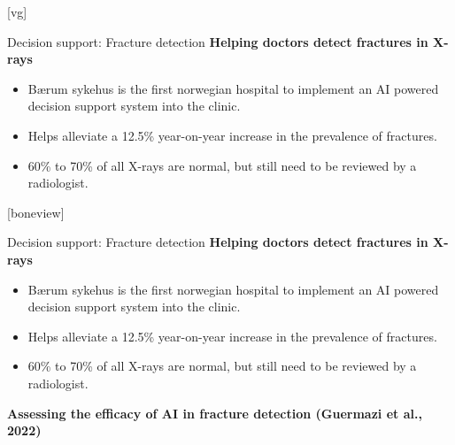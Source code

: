 \documentclass[8pt]{beamer}
\begin{document}
	[vg]

	\begin{frame}[t]{Decision support: Fracture detection}
		\textbf{Helping doctors detect fractures in X-rays}\\
		\begin{itemize}
			\item Bærum sykehus is the first norwegian hospital to implement an AI powered decision support system into the clinic.
			\item Helps alleviate a 12.5\% year-on-year increase in the prevalence of fractures.
			\item 60\% to 70\% of all X-rays are normal, but still need to be reviewed by a radiologist.
		\end{itemize}
		\vspace{0.5cm}
		\centering
	\end{frame}

	[boneview]

	\begin{frame}[t]{Decision support: Fracture detection}
		\textbf{Helping doctors detect fractures in X-rays}\\
		\begin{itemize}
			\item Bærum sykehus is the first norwegian hospital to implement an AI powered decision support system into the clinic.
			\item Helps alleviate a 12.5\% year-on-year increase in the prevalence of fractures.
			\item 60\% to 70\% of all X-rays are normal, but still need to be reviewed by a radiologist.
		\end{itemize}
		\textbf{Assessing the efficacy of AI in fracture detection (Guermazi et al., 2022)}\\
		\vspace{0.5cm}
		\centering
	\end{frame}
\end{document}
